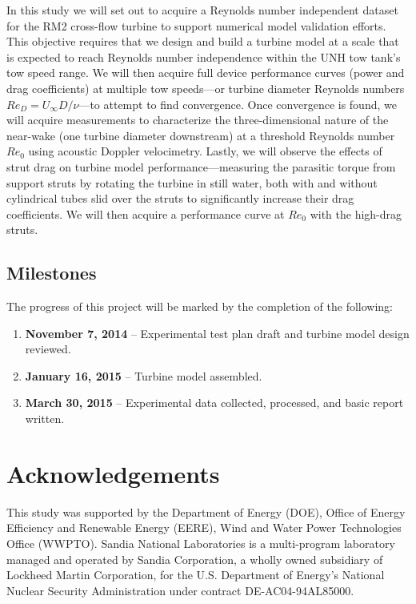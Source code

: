 \documentclass[12pt,letterpaper]{scrreprt}
\begin{document}
In this study we will set out to acquire a Reynolds number independent dataset
for the RM2 cross-flow turbine to support numerical model validation efforts.
This objective requires that we design and build a turbine model at a scale that
is expected to reach Reynolds number independence within the UNH tow tank's tow
speed range. We will then acquire full device performance curves (power and drag
coefficients) at multiple tow speeds---or turbine diameter Reynolds numbers
$Re_D = U_\infty D/ \nu$---to attempt to find convergence. Once convergence is
found, we will acquire measurements to characterize the three-dimensional nature
of the near-wake (one turbine diameter downstream) at a threshold Reynolds
number $Re_0$ using acoustic Doppler velocimetry. Lastly, we will observe the
effects of strut drag on turbine model performance---measuring the parasitic
torque from support struts by rotating the turbine in still water, both with and
without cylindrical tubes slid over the struts to significantly increase their
drag coefficients. We will then acquire a performance curve at $Re_0$ with the
high-drag struts.


\section{Milestones}
The progress of this project will be marked by the completion of the following:

\begin{enumerate}

	\item \textbf{November 7, 2014} -- Experimental test plan draft and turbine
	model design reviewed.
	
	\item \textbf{January 16, 2015} -- Turbine model assembled.
	
	\item \textbf{March 30, 2015} -- Experimental data collected, processed, and
	basic report written.

\end{enumerate}


\chapter{Acknowledgements}

This study was supported by the Department of Energy (DOE), Office of Energy
Efficiency and Renewable Energy (EERE), Wind and Water Power Technologies Office
(WWPTO). Sandia National Laboratories is a multi-program laboratory managed and
operated by Sandia Corporation, a wholly owned subsidiary of Lockheed Martin
Corporation, for the U.S. Department of Energy's National Nuclear Security
Administration under contract DE-AC04-94AL85000.
\end{document}
